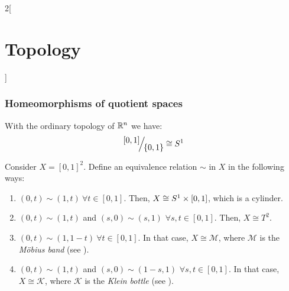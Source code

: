\documentclass[../../../main_math.tex]{subfiles}
\begin{document}
\begin{multicols}{2}[\section{Topology}]
  \subsubsection{Homeomorphisms of quotient spaces}
  \begin{proposition}
    With the ordinary topology of $\RR^n$ we have: $$\quot{[0,1]}{\{0,1\}}\cong \S^1$$
  \end{proposition}
  \begin{proposition}\label{TOP:square-sim}
    Consider $X=[0,1]^2$. Define an equivalence relation $\sim$ in $X$ in the following ways:
    \begin{enumerate}
      \item $(0,t)\sim(1,t)\ \forall t\in[0,1]$. Then, $X\cong \S^1\times [0,1]$, which is a cylinder.
      \item $(0,t)\sim(1,t)$ and $(s,0)\sim(s,1)$ $\forall s,t\in[0,1]$. Then, $X\cong T^2$.
      \item $(0,t)\sim(1,1-t)\ \forall t\in[0,1]$. In that case, $X\cong \mathcal{M}$, where $\mathcal{M}$ is the \emph{Möbius band} (see ).
      \item $(0,t)\sim(1,t)$ and $(s,0)\sim(1-s,1)$ $\forall s,t\in[0,1]$. In that case, $X\cong \mathcal{K}$, where $\mathcal{K}$ is the \emph{Klein bottle} (see ).
    \end{enumerate}
    \begin{center}
      \begin{minipage}{\linewidth}
        \centering
        
        \label{TOP:fig-MK}
      \end{minipage}
    \end{center}
  \end{proposition}
  \begin{center}
    \begin{minipage}{\linewidth}
      \centering
      
      \label{TOP:moebius}
    \end{minipage}
  \end{center}
  \begin{center}
    \begin{minipage}{\linewidth}
      \centering
      

\end{minipage}
\end{center}
\end{multicols}
\end{document}
